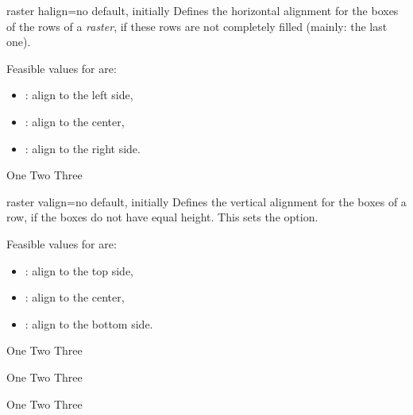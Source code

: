 \clearpage

\begin{docTcbKey}[][doc new=2014-11-10]{raster halign}{=}{no default, initially }
  Defines the horizontal alignment for the boxes of the rows of a \emph{raster},
  if these rows are not completely filled (mainly: the last one).

  Feasible values for  are:
  \begin{itemize}
  \item{}: align to the left side,
  \item{}: align to the center,
  \item{}: align to the right side.
  \end{itemize}

\begin{dispExample}
\begin{tcbitemize}[raster halign=center,
  size=small,colframe=red!50!black,colback=red!10!white]
  \tcbitem One
  \tcbitem Two
  \tcbitem Three
\end{tcbitemize}
\end{dispExample}
\end{docTcbKey}


\begin{docTcbKey}[][doc new=2014-11-10]{raster valign}{=}{no default, initially }
  Defines the vertical alignment for the boxes of a row,
  if the boxes do not have equal height. This sets the
   option.

  Feasible values for  are:
  \begin{itemize}
  \item{}: align to the top side,
  \item{}: align to the center,
  \item{}: align to the bottom side.
  \end{itemize}

\begin{dispExample}
\begin{tcbitemize}[raster valign=top, raster columns=3,
  size=small,colframe=red!50!black,colback=red!10!white]
  \tcbitem \Huge One
  \tcbitem \Large Two
  \tcbitem Three
\end{tcbitemize}
\begin{tcbitemize}[raster valign=center, raster columns=3,
  size=small,colframe=blue!50!black,colback=blue!10!white]
  \tcbitem \Huge One
  \tcbitem \Large Two
  \tcbitem Three
\end{tcbitemize}
\begin{tcbitemize}[raster valign=bottom, raster columns=3,
  size=small,colframe=green!50!black,colback=green!10!white]
  \tcbitem \Huge One
  \tcbitem \Large Two
  \tcbitem Three
\end{tcbitemize}
\end{dispExample}
\end{docTcbKey}


